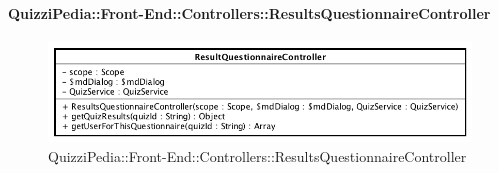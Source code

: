 \paragraph{QuizziPedia::Front-End::Controllers::ResultsQuestionnaireController}
\begin{figure} [ht]
	\centering
	\includegraphics[scale=0.45]{UML/Classi/Front-End/QuizziPedia_Front-end_Controller_ResultsQuestionnaireController.png}
	\caption{QuizziPedia::Front-End::Controllers::ResultsQuestionnaireController}
\end{figure} \FloatBarrier
